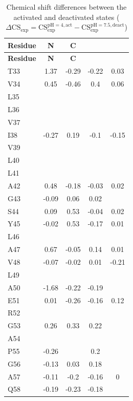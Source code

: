 \documentclass[%
 aip,
 amsmath,amssymb,
 preprint,%
]{revtex4-1}
\newcommand{\ca}{\ce{C_\alpha} }
\newcommand{\cb}{\ce{C_\beta} }
\begin{document}
\begingroup
\begin{center}
\begin{longtable}{l|c|c|c|c}
\caption{\scriptsize Chemical shift differences between the activated and deactivated states ($\Delta\text{CS}_{\text{exp}} = \text{CS}_{\text{exp}}^{\text{pH} = 4, \text{act}} - \text{CS}_{\text{exp}}^{\text{pH} = 7.5,\text{deact}}$)\label{SI_tb_DeltaCSexp}}\\ 
\hline 
\hline 
\textbf{Residue} & \textbf{N} & \textbf{C} & \textbf{\ca} & \textbf{\cb} \\ \hline
\endfirsthead 
\hline
\textbf{Residue} & \textbf{N} & \textbf{C} & \textbf{\ca} & \textbf{\cb} \\ \hline
\endhead
T33 & 1.37 & -0.29 & -0.22 & 0.03 \\\hline
V34 & 0.45 & -0.46 & 0.4 & 0.06 \\\hline
L35 & & & & \\\hline
L36 & & & & \\\hline
V37 & & & & \\\hline
I38 & -0.27 & 0.19 & -0.1 & -0.15 \\\hline
V39 & & & & \\\hline
L40 & & & & \\\hline
L41 & & & & \\\hline
A42 & 0.48 & -0.18 & -0.03 & 0.02 \\\hline
G43 & -0.09 & 0.06 & 0.02 & \\\hline
S44 & 0.09 & 0.53 & -0.04 & 0.02 \\\hline
Y45 & -0.02 & 0.53 & -0.17 & 0.01 \\\hline
L46 & & & & \\\hline
A47 & 0.67 & -0.05 & 0.14 & 0.01 \\\hline
V48 & -0.07 & -0.02 & 0.01 & -0.21 \\\hline
L49 & & & & \\\hline
A50 & -1.68 & -0.22 & -0.19 & \\\hline
E51 & 0.01 & -0.26 & -0.16 & 0.12 \\\hline
R52 & & & & \\\hline
G53 & 0.26 & 0.33 & 0.22 & \\\hline
A54 & & & & \\\hline
P55 & -0.26 & & 0.2 & \\\hline
G56 & -0.13 & 0.03 & 0.18 & \\\hline
A57 & -0.11 & -0.2 & -0.16 & 0 \\\hline
Q58 & -0.19 & -0.23 & -0.18 & \\\hline

\end{longtable}
\end{center}
\end{document}
